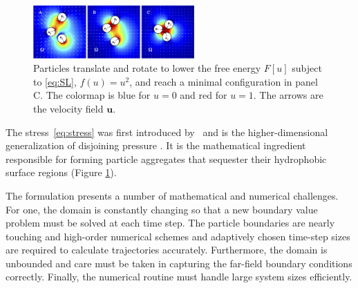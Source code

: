\begin{figure}
 \centering
 \vspace{-3pt}
 \includegraphics[width=0.55\textwidth]{figures/3Particles.jpg}
 \caption{\label{fig:3particles}
   \footnotesize
   Particles translate and rotate to lower the free energy $F[u]$
   subject to \eqref{eq:SL}, $f(u) = u^2$, and reach a minimal configuration in
   panel C. The colormap is blue for $u = 0$ and red for $u = 1$.
   The arrows are the velocity field $\mathbf{u}$.
 }
\end{figure}
The stress~\eqref{eq:stress} was first
introduced by~\cite{Fu2018_SIAM} and is the higher-dimensional
generalization of disjoining pressure \cite{MaRa76, ErLjCl89, KoNa15,
Nagle17, KUZMIN2005}. It is the mathematical ingredient responsible for
forming particle aggregates that sequester their hydrophobic surface
regions (Figure \ref{fig:3particles}).


The formulation presents a number of mathematical and numerical
challenges. For one, the domain is constantly changing so that a new
boundary value problem must be solved at each time step. The particle
boundaries are nearly touching and high-order numerical
schemes and adaptively chosen time-step sizes
are required to calculate trajectories accurately.
Furthermore, the domain is unbounded and care must be taken 
in capturing the far-field boundary conditions correctly. 
Finally, the numerical routine must handle large system sizes
efficiently.


